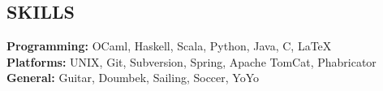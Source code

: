 \documentclass[line,margin]{res}
\begin{document}
\begin{resume}
  \section{SKILLS}
  {\bf Programming:} OCaml, Haskell, Scala, Python, Java, C, \LaTeX \\
  {\bf Platforms:} UNIX, Git, Subversion, Spring,
  Apache TomCat, Phabricator \\
  {\bf General:} Guitar, Doumbek, Sailing, Soccer, YoYo \\
\end{resume}
\end{document}
